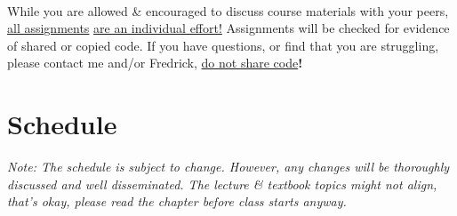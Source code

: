 \documentclass[letter,11pt]{article}
\begin{document}
\paragraph{}While you are allowed \& encouraged to discuss course materials with your peers, \underline{all assignments} \underline{are an individual effort!} Assignments will be checked for evidence of shared or copied code. If you have questions, or find that you are struggling, please contact me and/or Fredrick, \underline{do not share code}\textbf{!}

\section*{Schedule}
\textit{Note: The schedule is subject to change. However, any changes will be thoroughly discussed and well disseminated. The lecture \& textbook topics might not align, that's okay, please read the chapter before class starts anyway.}
\end{document}
